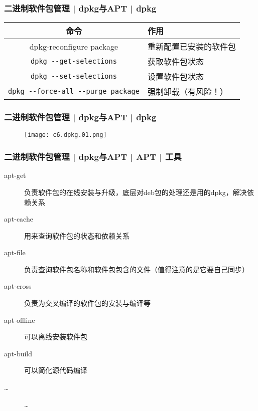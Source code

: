 \begin{frame}[fragile]
  \frametitle{二进制软件包管理 | dpkg与APT | dpkg}
  \begin{table}
    \centering
    \begin{tabularx}{\textwidth}{cX}
      \hline
      \rowcolor{blue!50}命令 & 作用\\
      \hline
      dpkg-reconfigure package & 重新配置已安装的软件包\\
      \verb|dpkg --get-selections| & 获取软件包状态\\
      \verb|dpkg --set-selections| & 设置软件包状态\\
      \verb|dpkg --force-all --purge package| & 强制卸载（有风险！）\\
      \hline
    \end{tabularx}
  \end{table}
\end{frame}

\begin{frame}
  \frametitle{二进制软件包管理 | dpkg与APT | dpkg}
  \begin{figure}
    \centering
    \texttt{[image: c6.dpkg.01.png]}
  \end{figure}
\end{frame}

\begin{frame}
  \frametitle{二进制软件包管理 | dpkg与APT | APT | 工具}
  \begin{description}
    \item[apt-get] 负责软件包的在线安装与升级，底层对deb包的处理还是用的dpkg，解决依赖关系
    \item[apt-cache] 用来查询软件包的状态和依赖关系
    \item[apt-file] 负责查询软件包名称和软件包包含的文件（值得注意的是它要自己同步）
    \item[apt-cross] 负责为交叉编译的软件包的安装与编译等
    \item[apt-offline] 可以离线安装软件包
    \item[apt-build] 可以简化源代码编译
    \item[\ldots] \ldots
  \end{description}
\end{frame}

